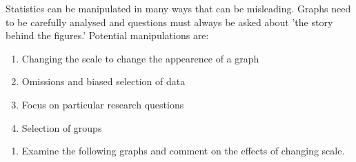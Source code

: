 Statistics can be manipulated in many ways that can be misleading. Graphs need to be carefully analysed and questions must always be asked about 'the story behind the figures.' Potential manipulations are:
\begin{enumerate}
\item Changing the scale to change the appearence of a graph
\item Omissions and biased selection of data
\item Focus on particular research questions
\item Selection of groups
\end{enumerate}

{
\begin{enumerate}
\item Examine the following graphs and comment on the effects of changing scale.


\end{enumerate}}
